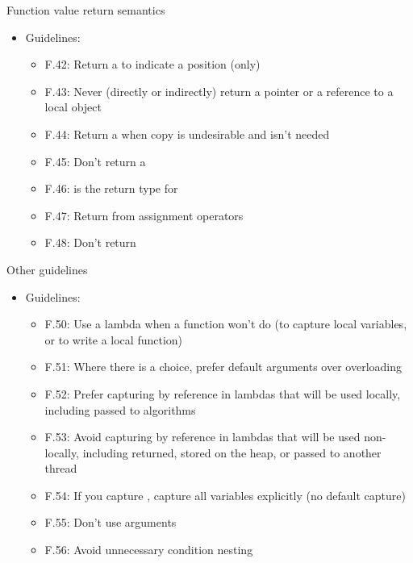 \begin{frame}[t]{Function value return semantics}
\begin{itemize}
  \item Guidelines:
    \begin{itemize}
      \item F.42: Return a  to indicate a position (only)
      \item F.43: Never (directly or indirectly) return a pointer or a reference to a local object
      \item F.44: Return a  when copy is undesirable and 
                   isn’t needed
      \item F.45: Don’t return a 
      \item F.46:  is the return type for 
      \item F.47: Return  from assignment operators
      \item F.48: Don’t return 
    \end{itemize}
\end{itemize}
\end{frame}

\begin{frame}[t]{Other guidelines}
\begin{itemize}
  \item Guidelines:
    \begin{itemize}
      \item F.50: Use a lambda when a function won’t do 
            (to capture local variables, or to write a local function)
      \item F.51: Where there is a choice, prefer default arguments over overloading
      \item F.52: Prefer capturing by reference in lambdas that will be used locally, 
            including passed to algorithms
      \item F.53: Avoid capturing by reference in lambdas that will be used non-locally, 
            including returned, stored on the heap, or passed to another thread
      \item F.54: If you capture , capture all variables explicitly (no default capture)
      \item F.55: Don’t use  arguments
      \item F.56: Avoid unnecessary condition nesting
    \end{itemize}
\end{itemize}
\end{frame}



